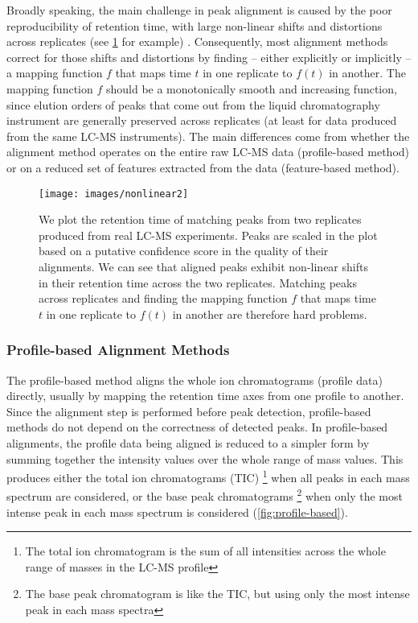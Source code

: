 Broadly speaking, the main challenge in peak alignment is caused by the poor reproducibility of retention time, with large non-linear shifts and distortions across replicates (see \ref{fig:We-plot-the} for example) . Consequently, most alignment methods correct for those shifts and distortions by finding -- either explicitly or implicitly -- a mapping function $f$ that maps time $t$ in one replicate to $f(t)$ in another. The mapping function $f$ should be a monotonically smooth and increasing function, since elution orders of peaks that come out from the liquid chromatography instrument are generally preserved across replicates (at least for data produced from the same LC-MS instruments). The main differences come from whether the alignment method operates on the entire raw LC-MS data (profile-based method) or on a reduced set of features extracted from the data (feature-based method).

\begin{figure}[h]
\noindent \begin{centering}
\texttt{[image: images/nonlinear2]}
\par\end{centering}

\caption{\label{fig:We-plot-the}We plot the retention time of matching peaks from two replicates produced from real LC-MS experiments. Peaks are scaled in the plot based on a putative confidence score in the quality of their alignments. We can see that aligned peaks exhibit non-linear shifts in their retention time across the two replicates. Matching peaks across replicates and finding the mapping function $f$ that maps time $t$ in one replicate to $f(t)$ in another are therefore hard problems.}

\end{figure}

\subsubsection{\label{sub:Profile-based-Alignment-Methods}Profile-based Alignment
Methods}

The profile-based method aligns the whole ion chromatograms (profile data) directly, usually by mapping the retention time axes from one profile to another. Since the alignment step is performed before peak detection, profile-based methods do not depend on the correctness of detected peaks. In profile-based alignments, the profile data being aligned is reduced to a simpler form by summing together the intensity values over the whole range of mass values. This produces either the total ion chromatograms (TIC) \footnote{The total ion chromatogram is the sum of all intensities across the whole range of masses in the LC-MS profile} when all peaks in each mass spectrum are considered, or the base peak chromatograms \footnote{The base peak chromatogram is like the TIC, but using only the most intense peak in each mass spectra} when only the most intense peak in each mass spectrum is considered (\ref{fig:profile-based}).

